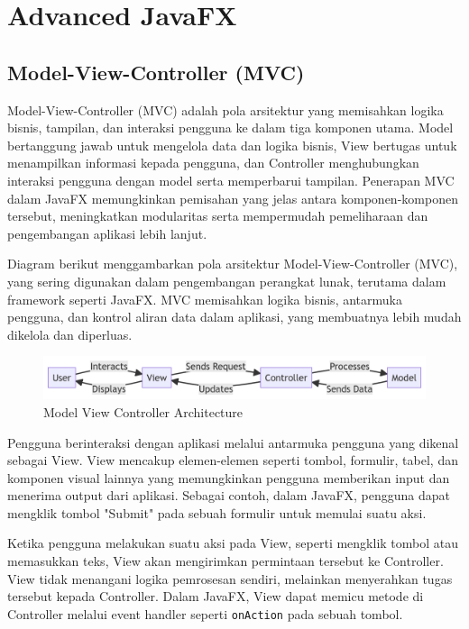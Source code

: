 \chapter{Advanced JavaFX}

\section{Model-View-Controller (MVC)}

Model-View-Controller (MVC) adalah pola arsitektur yang memisahkan logika bisnis, tampilan, dan interaksi pengguna ke dalam tiga komponen utama. Model bertanggung jawab untuk mengelola data dan logika bisnis, View bertugas untuk menampilkan informasi kepada pengguna, dan Controller menghubungkan interaksi pengguna dengan model serta memperbarui tampilan. Penerapan MVC dalam JavaFX memungkinkan pemisahan yang jelas antara komponen-komponen tersebut, meningkatkan modularitas serta mempermudah pemeliharaan dan pengembangan aplikasi lebih lanjut.

Diagram berikut menggambarkan pola arsitektur Model-View-Controller (MVC), yang sering digunakan dalam pengembangan perangkat lunak, terutama dalam framework seperti JavaFX. MVC memisahkan logika bisnis, antarmuka pengguna, dan kontrol aliran data dalam aplikasi, yang membuatnya lebih mudah dikelola dan diperluas.

\begin{figure}[ht]
	\centering
	\includegraphics[width=\textwidth]{../figures/mvc-modern.png}
	\caption{Model View Controller Architecture}
	\label{fig:mvc_architecture}
\end{figure}

Pengguna berinteraksi dengan aplikasi melalui antarmuka pengguna yang dikenal sebagai View. View mencakup elemen-elemen seperti tombol, formulir, tabel, dan komponen visual lainnya yang memungkinkan pengguna memberikan input dan menerima output dari aplikasi. Sebagai contoh, dalam JavaFX, pengguna dapat mengklik tombol "Submit" pada sebuah formulir untuk memulai suatu aksi.

Ketika pengguna melakukan suatu aksi pada View, seperti mengklik tombol atau memasukkan teks, View akan mengirimkan permintaan tersebut ke Controller. View tidak menangani logika pemrosesan sendiri, melainkan menyerahkan tugas tersebut kepada Controller. Dalam JavaFX, View dapat memicu metode di Controller melalui event handler seperti \texttt{onAction} pada sebuah tombol.

